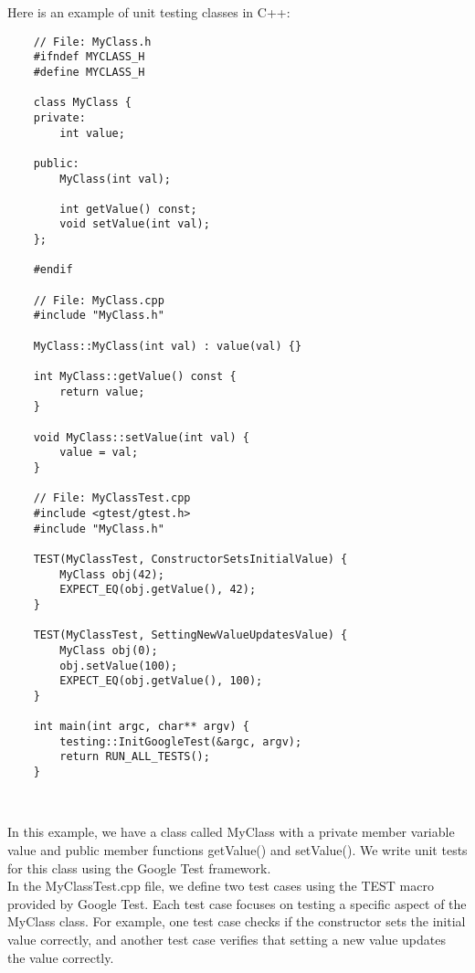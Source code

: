 \begin{solution}
    Here is an example of unit testing classes in C++: \\
    \horizontalline
    \begin{verbatim}
    // File: MyClass.h
    #ifndef MYCLASS_H
    #define MYCLASS_H
    
    class MyClass {
    private:
        int value;
    
    public:
        MyClass(int val);
    
        int getValue() const;
        void setValue(int val);
    };
    
    #endif
    
    // File: MyClass.cpp
    #include "MyClass.h"
    
    MyClass::MyClass(int val) : value(val) {}
    
    int MyClass::getValue() const {
        return value;
    }
    
    void MyClass::setValue(int val) {
        value = val;
    }
    
    // File: MyClassTest.cpp
    #include <gtest/gtest.h>
    #include "MyClass.h"
    
    TEST(MyClassTest, ConstructorSetsInitialValue) {
        MyClass obj(42);
        EXPECT_EQ(obj.getValue(), 42);
    }
    
    TEST(MyClassTest, SettingNewValueUpdatesValue) {
        MyClass obj(0);
        obj.setValue(100);
        EXPECT_EQ(obj.getValue(), 100);
    }
    
    int main(int argc, char** argv) {
        testing::InitGoogleTest(&argc, argv);
        return RUN_ALL_TESTS();
    }        
    \end{verbatim} \\
    \horizontalline

    In this example, we have a class called MyClass with a private member variable value and public member functions getValue() and setValue(). We write unit tests for this class using the Google Test framework. \\

    \noindent In the MyClassTest.cpp file, we define two test cases using the TEST macro provided by Google Test. Each test case focuses on testing a specific aspect of the MyClass class. For example, one test case checks if the constructor sets the initial value correctly, and another 
    test case verifies that setting a new value updates the value correctly. \\


\end{solution}

